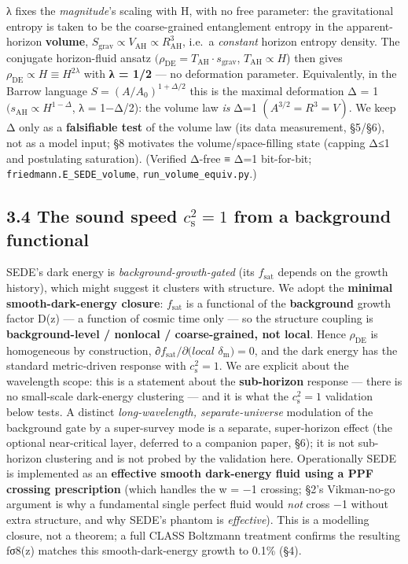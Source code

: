 \documentclass[
  10pt,
]{article}
\begin{document}
λ fixes the \emph{magnitude}'s scaling with H, with no free parameter:
the gravitational entropy is taken to be the coarse-grained entanglement
entropy in the apparent-horizon \textbf{volume},
\(S_{\mathrm{grav}} \propto  V_{\mathrm{AH}} \propto  R_{\mathrm{AH}}^{3}\),
i.e.~a \emph{constant} horizon entropy density. The conjugate
horizon-fluid ansatz
\((\rho _{\mathrm{DE}} = T_{\mathrm{AH}}\cdot s_{\mathrm{grav}}\),
\(T_{\mathrm{AH}} \propto  H\)) then gives
\(\rho _{\mathrm{DE}} \propto  H \equiv  H^{2\lambda }\) with \textbf{λ
= 1/2} --- no deformation parameter. Equivalently, in the Barrow
language \(S = (A/A_{0})^{1+\Delta /2}\) this is the maximal deformation
Δ = 1 \((s_{\mathrm{AH}} \propto  H^{1-\Delta }\), λ = 1−Δ/2): the
volume law \emph{is} Δ=1 \((A^{3/2} = R^{3} = V)\). We keep Δ only as a
\textbf{falsifiable test} of the volume law (its data measurement,
§5/§6), not as a model input; §8 motivates the volume/space-filling
state (capping Δ≤1 and postulating saturation). (Verified Δ-free ≡ Δ=1
bit-for-bit; \texttt{friedmann.E\_SEDE\_volume},
\texttt{run\_volume\_equiv.py}.)

\subsection{\texorpdfstring{3.4 The sound speed
\(c_{\mathrm{s}}^{2} = 1\) from a background
functional}{3.4 The sound speed c\_\{\textbackslash mathrm\{s\}\}\^{}\{2\} = 1 from a background functional}}\label{the-sound-speed-c_mathrms2-1-from-a-background-functional}

SEDE's dark energy is \emph{background-growth-gated} (its
\(f_{\mathrm{sat}}\) depends on the growth history), which might suggest
it clusters with structure. We adopt the \textbf{minimal
smooth-dark-energy closure}: \(f_{\mathrm{sat}}\) is a functional of the
\textbf{background} growth factor D(z) --- a function of cosmic time
only --- so the structure coupling is \textbf{background-level /
nonlocal / coarse-grained, not local}. Hence \(\rho _{\mathrm{DE}}\) is
homogeneous by construction, ∂\(f_{\mathrm{sat}}/\partial (local\)
\(\delta _{\mathrm{m}}) = 0\), and the dark energy has the standard
metric-driven response with \textbf{\(c_{\mathrm{s}}^{2} = 1\)}. We are
explicit about the wavelength scope: this is a statement about the
\textbf{sub-horizon} response --- there is no small-scale dark-energy
clustering --- and it is what the \(c_{\mathrm{s}}^{2} = 1\) validation
below tests. A distinct \emph{long-wavelength, separate-universe}
modulation of the background gate by a super-survey mode is a separate,
super-horizon effect (the optional near-critical layer, deferred to a
companion paper, §6); it is not sub-horizon clustering and is not probed
by the validation here. Operationally SEDE is implemented as an
\textbf{effective smooth dark-energy fluid using a PPF crossing
prescription} (which handles the w = −1 crossing; §2's Vikman-no-go
argument is why a fundamental single perfect fluid would \emph{not}
cross −1 without extra structure, and why SEDE's phantom is
\emph{effective}). This is a modelling closure, not a theorem; a full
CLASS Boltzmann treatment confirms the resulting fσ8(z) matches this
smooth-dark-energy growth to 0.1\% (§4).
\end{document}
